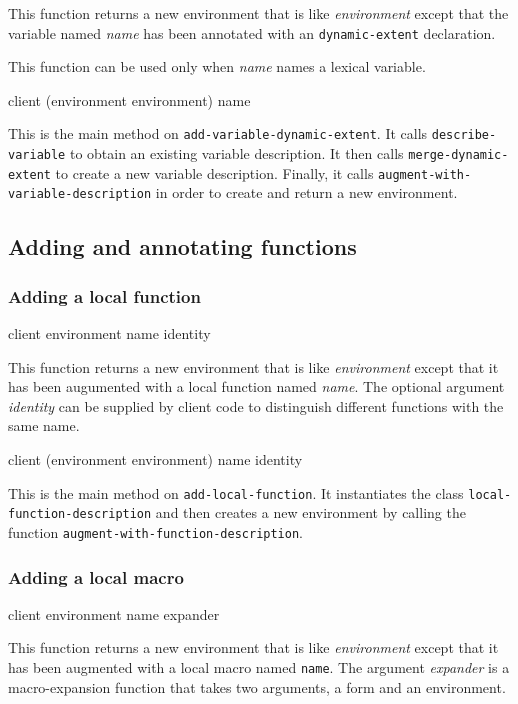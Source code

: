 This function returns a new environment that is like
\textit{environment} except that the variable named \textit{name} has
been annotated with an \texttt{dynamic-extent} declaration.

This function can be used only when \textit{name} names a lexical variable.

{\footnotesize
{}
{client
 (environment environment)
 name}
}

This is the main method on \texttt{add-variable-dynamic-extent}.  It
calls \texttt{describe-variable} to obtain an existing variable
description.  It then calls \texttt{merge-dynamic-extent} to create a new
variable description.  Finally, it calls
\texttt{augment-with-variable-description} in order to create and
return a new environment.

\subsection{Adding and annotating functions}

\subsubsection{Adding a local function}

{\footnotesize
{} {client environment name \optional identity}
}

This function returns a new environment that is like
\textit{environment} except that it has been augumented with a local
function named \textit{name}.  The optional argument \textit{identity}
can be supplied by client code to distinguish different functions with
the same name.

{\footnotesize
{}
{client
 (environment environment)
 name
 \optional identity}
}

This is the main method on \texttt{add-local-function}.  It
instantiates the class \texttt{local-function-description} and then
creates a new environment by calling the function
\texttt{augment-with-function-description}.

\subsubsection{Adding a local macro}

{\footnotesize
{} {client environment name expander}
}

This function returns a new environment that is like
\textit{environment} except that it has been augmented with a local
macro named \texttt{name}.  The argument \textit{expander} is a
macro-expansion function that takes two arguments, a form and an
environment.

